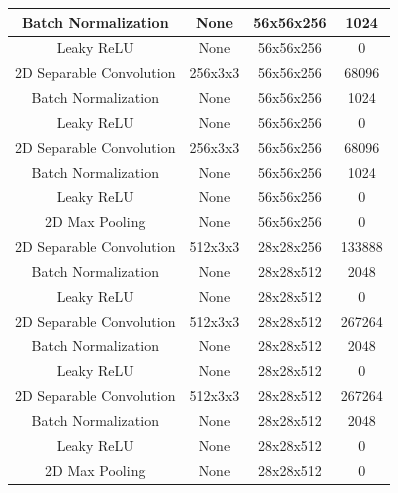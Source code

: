 \documentclass[runningheads]{llncs}
\begin{document}
\begin{table}[]
{\begin{tabular}{|c|c|c|c|}
Batch Normalization      & None           & 56x56x256            & 1024                       \\ \hline
Leaky ReLU               & None           & 56x56x256            & 0                          \\ \hline
2D Separable Convolution & 256x3x3        & 56x56x256            & 68096                      \\ \hline
Batch Normalization      & None           & 56x56x256            & 1024                       \\ \hline
Leaky ReLU               & None           & 56x56x256            & 0                          \\ \hline
2D Separable Convolution & 256x3x3        & 56x56x256            & 68096                      \\ \hline
Batch Normalization      & None           & 56x56x256            & 1024                       \\ \hline
Leaky ReLU               & None           & 56x56x256            & 0                          \\ \hline
2D Max Pooling           & None           & 56x56x256            & 0                          \\ \hline
2D Separable Convolution & 512x3x3        & 28x28x256            & 133888                     \\ \hline
Batch Normalization      & None           & 28x28x512            & 2048                       \\ \hline
Leaky ReLU               & None           & 28x28x512            & 0                          \\ \hline
2D Separable Convolution & 512x3x3        & 28x28x512            & 267264                     \\ \hline
Batch Normalization      & None           & 28x28x512            & 2048                       \\ \hline
Leaky ReLU               & None           & 28x28x512            & 0                          \\ \hline
2D Separable Convolution & 512x3x3        & 28x28x512            & 267264                     \\ \hline
Batch Normalization      & None           & 28x28x512            & 2048                       \\ \hline
Leaky ReLU               & None           & 28x28x512            & 0                          \\ \hline
2D Max Pooling           & None           & 28x28x512            & 0                          \\ \hline

\end{tabular}}
\end{table}
\end{document}
